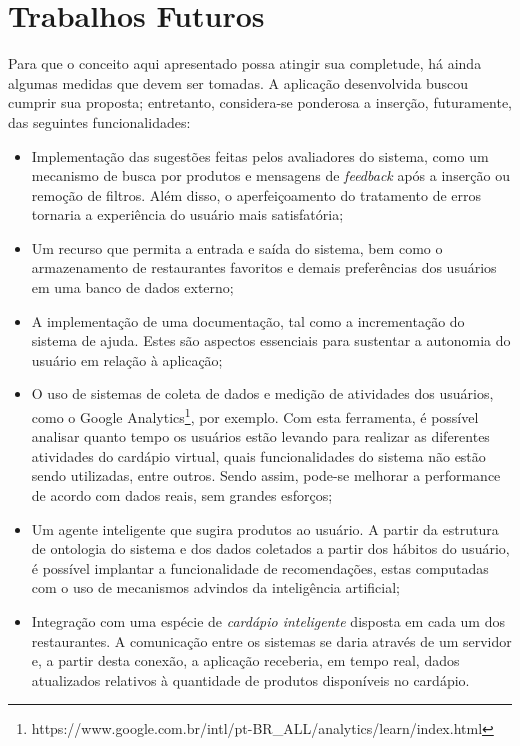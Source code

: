\section{Trabalhos Futuros}

Para que o conceito aqui apresentado possa atingir sua completude, há ainda algumas medidas que devem ser tomadas. A aplicação desenvolvida buscou cumprir sua proposta; entretanto, considera-se ponderosa a inserção, futuramente, das seguintes funcionalidades:
\begin{itemize}
	\item Implementação das sugestões feitas pelos avaliadores do sistema, como um mecanismo de busca por produtos e mensagens de \emph{feedback} após a inserção ou remoção de filtros. Além disso, o aperfeiçoamento do tratamento de erros tornaria a experiência do usuário mais satisfatória;
	\item Um recurso que permita a entrada e saída do sistema, bem como o armazenamento de restaurantes favoritos e demais preferências dos usuários em uma banco de dados externo;
	\item A implementação de uma documentação, tal como a incrementação do sistema de ajuda. Estes são aspectos essenciais para sustentar a autonomia do usuário em relação à aplicação;
	\item O uso de sistemas de coleta de dados e medição de atividades dos usuários, como o Google Analytics\footnote{https://www.google.com.br/intl/pt-BR\_ALL/analytics/learn/index.html}, por exemplo. Com esta ferramenta, é possível analisar quanto tempo os usuários estão levando para realizar as diferentes atividades do cardápio virtual, quais funcionalidades do sistema não estão sendo utilizadas, entre outros. Sendo assim, pode-se melhorar a performance de acordo com dados reais, sem grandes esforços;
	\item Um agente inteligente que sugira produtos ao usuário. A partir da estrutura de ontologia do sistema e dos dados coletados a partir dos hábitos do usuário, é possível implantar a funcionalidade de recomendações, estas computadas com o uso de mecanismos advindos da inteligência artificial;
	\item Integração com uma espécie de \emph{cardápio inteligente} disposta em cada um dos restaurantes. A comunicação entre os sistemas se daria através de um servidor e, a partir desta conexão, a aplicação receberia, em tempo real, dados atualizados relativos à quantidade de produtos disponíveis no cardápio.
\end{itemize}
\color{black}